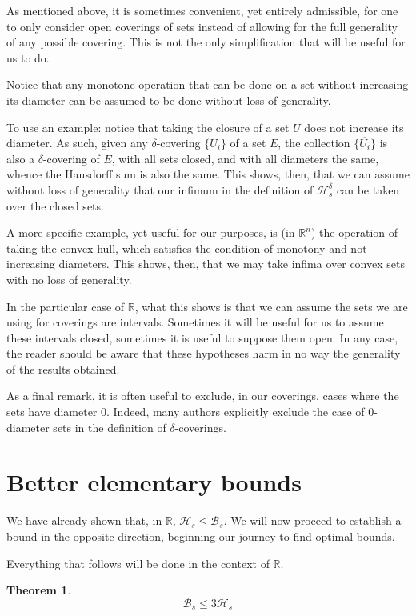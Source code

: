 \documentclass[11pt]{amsart}
\newcommand{\R}{\mathbb{R}}
\newcommand{\HH}{\mathcal{H}}
\newcommand{\BB}{\mathcal{B}}
\newtheorem{theorem}{Theorem}
\begin{document}
As mentioned above, it is sometimes convenient, yet entirely admissible, for one to only consider open coverings of sets instead of allowing for the full generality of any possible covering. This is not the only simplification that will be useful for us to do.

Notice that any monotone operation that can be done on a set without increasing its diameter can be assumed to be done without loss of generality.

To use an example: notice that taking the closure of a set $U$ does not increase its diameter. As such, given any $\delta$-covering $\{U_i\}$ of a set $E$, the collection $\{ \overline{U_i} \}$ is also a $\delta$-covering of $E$, with all sets closed, and with all diameters the same, whence the Hausdorff sum is also the same. This shows, then, that we can assume without loss of generality that our infimum in the definition of $\HH_s^\delta$ can be taken over the closed sets.

A more specific example, yet useful for our purposes, is (in $\R^n$) the operation of taking the convex hull, which satisfies the condition of monotony and not increasing diameters. This shows, then, that we may take infima over convex sets with no loss of generality.

In the particular case of $\R$, what this shows is that we can assume the sets we are using for coverings are intervals. Sometimes it will be useful for us to assume these intervals closed, sometimes it is useful to suppose them open. In any case, the reader should be aware that these hypotheses harm in no way the generality of the results obtained.

As a final remark, it is often useful to exclude, in our coverings, cases where the sets have diameter 0. Indeed, many authors explicitly exclude the case of 0-diameter sets in the definition of $\delta$-coverings.

\section{Better elementary bounds}

We have already shown that, in $\R$, $\HH_s \leq \BB_s$. We will now proceed to establish a bound in the opposite direction, beginning our journey to find optimal bounds.

Everything that follows will be done in the context of $\R$.

\begin{theorem}
\[ \BB_s \leq 3 \HH_s \]
\end{theorem}
\end{document}
